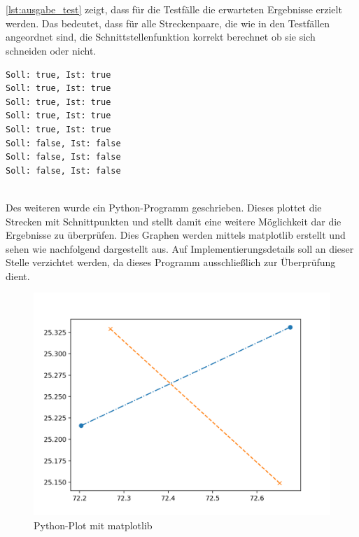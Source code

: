 \documentclass[12pt]{scrartcl}
\begin{document}
\ \\~\\
\autoref{lst:ausgabe_test} zeigt, dass für die Testfälle die erwarteten Ergebnisse erzielt werden.
Das bedeutet, dass für alle Streckenpaare, die wie in den Testfällen angeordnet sind, die Schnittstellenfunktion korrekt berechnet ob sie sich schneiden oder nicht.\\

\begin{lstlisting}[style=Terminal, caption={testing.cpp: Ausgabe Konsole},captionpos=b, label={lst:ausgabe_test}]
Soll: true, Ist: true
Soll: true, Ist: true
Soll: true, Ist: true
Soll: true, Ist: true
Soll: true, Ist: true
Soll: false, Ist: false
Soll: false, Ist: false
Soll: false, Ist: false
\end{lstlisting}

\ \\
Des weiteren wurde ein Python-Programm geschrieben. Dieses plottet die Strecken mit Schnittpunkten und stellt damit eine weitere Möglichkeit dar die Ergebnisse zu überprüfen. 
Dies Graphen werden mittels matplotlib erstellt und sehen wie nachfolgend dargestellt aus. Auf Implementierungsdetails soll an dieser Stelle verzichtet werden, da dieses Programm ausschließlich zur Überprüfung dient.

\begin{figure}[ht]
    \graphicspath{ {./pictures/} }
    \centering
    \includegraphics[scale=0.8]{python_plot1.png}
    \smallskip
    \caption{Python-Plot mit matplotlib}
    \label{fig:python_plots}
\end{figure}
\end{document}
